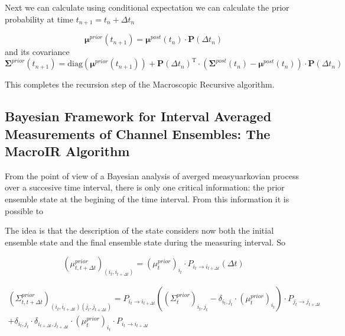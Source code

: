 \documentclass[pdflatex,sn-mathphys-num]{sn-jnl}%
\theoremstyle{thmstyleone}%
\theoremstyle{thmstyletwo}%
\theoremstyle{thmstylethree}%
\begin{document}
Next we can calculate using conditional expectation we can calculate the prior probability at time $t_{n+1}= t_n+\Delta t_n$  


\begin{equation}
	\mathbf \mu^{prior}(t_{n+1}) = \mathbf \mu^{post}(t_n) \cdot \mathbf P(\Delta t_n)
	\label{eq:macro_mean_next_prior}
\end{equation}
and its covariance 
\begin{equation}
	\mathbf \Sigma^{prior}(t_{n+1})= \mathrm{diag}(\mathbf \mu^{prior}(t_{n+1}) ) + {\mathbf P(\Delta t_n)}^\mathrm{T} \cdot (\mathbf \Sigma^{post}(t_{n})- \mathbf \mu^{post}(t_{n})) \cdot \mathbf P(\Delta t_n)
	\label{eq:macro_mean_next_cov}
\end{equation}

This completes the recursion step of the Macroscopic Recursive algorithm. 

\subsection{Bayesian Framework for Interval Averaged Measurements of Channel Ensembles: The MacroIR Algorithm}

From the point of view of a Bayesian analysis of averged measyuarkovian process over a succesive time interval, there is only one critical information: the prior ensemble state at the begining of the time interval. From this information it is possible to  


The idea is that the description of the state considers now both the initial ensemble state and the final ensemble state during the measuring interval. 
So 

\begin{equation}
	(\mu^{prior}_{t, t+ \Delta t})_{(i_t, i_{t+ \Delta t})} = (\mu^{prior}_{t})_{i_t}  \cdot P_{i_t \rightarrow i_{t+ \Delta t}}(\Delta t)
\end{equation}

\begin{multline}
	(\Sigma^{prior}_{t,t+ \Delta t})_{(i_t, i_{t+ \Delta t})(j_t, j_{t+ \Delta t})} =
	P_{i_t \rightarrow i_{t+ \Delta t}} \left((\Sigma^{prior}_{t})_{i_t ,j_t} - \delta_{i_t, j_t} \cdot (\mu^{prior}_t)_{i_t} \right)  \cdot P_{j_t \rightarrow j_{t+ \Delta t}} \\
	+ \delta_{i_t, j_t} \cdot \delta_{i_{t+ \Delta t}, j_{t+ \Delta t}} \cdot (\mu^{prior}_t)_{i_t}\cdot P_{i_t \rightarrow i_{t+ \Delta t}} 
\end{multline}
\end{document}
